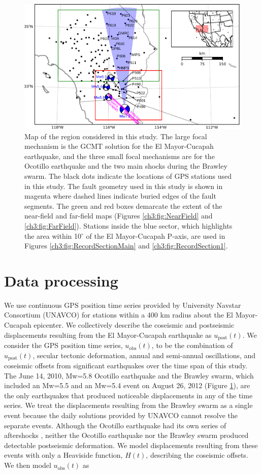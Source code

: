 \begin{figure}\label{ch3:fig:ContextMap}
\includegraphics[scale=1.0]{ch3/figures/2016jb013114-p01} 
\caption{Map of the region considered in this study.  The large focal mechanism is the GCMT solution for the El Mayor-Cucapah earthquake, and the three small focal mechanisms are for the Ocotillo earthquake and the two main shocks during the Brawley swarm.  The black dots indicate the locations of GPS stations used in this study.  The fault geometry used in this study is shown in magenta where dashed lines indicate buried edges of the fault segments.  The green and red boxes demarcate the extent of the near-field and far-field maps (Figures \ref{ch3:fig:NearField} and \ref{ch3:fig:FarField}).  Stations inside the blue sector, which highlights the area within 10$^\circ$ of the El Mayor-Cucapah P-axis, are used in Figures \ref{ch3:fig:RecordSectionMain} and \ref{ch3:fig:RecordSection1}.}       
\end{figure}

\section{Data processing}\label{ch3:sec:Data}
We use continuous GPS position time series provided by University Navstar Consortium (UNAVCO) for stations within a 400 km radius about the El Mayor-Cucapah epicenter. We collectively describe the coseismic and postseismic displacements resulting from the El Mayor-Cucapah earthquake as $u_\mathrm{post}(t)$.  We consider the GPS position time series, $u_\mathrm{obs}(t)$, to be the combination of $u_\mathrm{post}(t)$, secular tectonic deformation, annual and semi-annual oscillations, and coseismic offsets from significant earthquakes over the time span of this study.  The June 14, 2010, Mw=5.8 Ocotillo earthquake and the Brawley swarm, which included an Mw=5.5 and an Mw=5.4 event on August 26, 2012 (Figure \ref{ch3:fig:ContextMap}), are the only earthquakes that produced noticeable displacements in any of the time series.  We treat the displacements resulting from the Brawley swarm as a single event because the daily solutions provided by UNAVCO cannot resolve the separate events.  Although the Ocotillo earthquake had its own series of aftershocks \citep{Hauksson2011}, neither the Ocotillo earthquake nor the Brawley swarm produced detectable postseismic deformation.  We model displacements resulting from these events with only a Heaviside function, $H(t)$, describing the coseismic offsets.  We then model $u_\mathrm{obs}(t)$ as 


